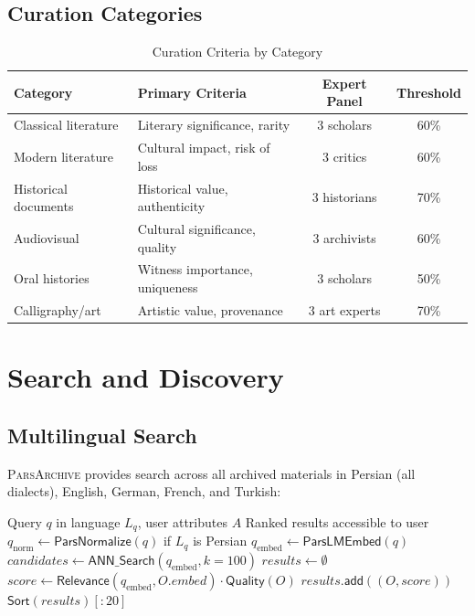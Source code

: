 \documentclass[11pt,a4paper]{article}
\newcommand{\parsarch}{\textsc{ParsArchive}\xspace}
\begin{document}
\subsection{Curation Categories}

\begin{table}[H]
\centering
\caption{Curation Criteria by Category}
\label{tab:curation}
\begin{tabular}{llcc}
\toprule
\textbf{Category} & \textbf{Primary Criteria} & \textbf{Expert Panel} & \textbf{Threshold} \\
\midrule
Classical literature & Literary significance, rarity & 3 scholars & 60\% \\
Modern literature & Cultural impact, risk of loss & 3 critics & 60\% \\
Historical documents & Historical value, authenticity & 3 historians & 70\% \\
Audiovisual & Cultural significance, quality & 3 archivists & 60\% \\
Oral histories & Witness importance, uniqueness & 3 scholars & 50\% \\
Calligraphy/art & Artistic value, provenance & 3 art experts & 70\% \\
\bottomrule
\end{tabular}
\end{table}

\section{Search and Discovery}

\subsection{Multilingual Search}

\parsarch provides search across all archived materials in Persian (all dialects), English, German, French, and Turkish:

\begin{algorithm}[H]
\caption{Cross-Lingual Search}
\label{alg:search}
\begin{algorithmic}[1]
\Require Query $q$ in language $L_q$, user attributes $A$
\Ensure Ranked results accessible to user
\State $q_{\text{norm}} \leftarrow \mathsf{ParsNormalize}(q)$ if $L_q$ is Persian
\State $q_{\text{embed}} \leftarrow \mathsf{ParsLMEmbed}(q)$ 
\State $\mathit{candidates} \leftarrow \mathsf{ANN\_Search}(q_{\text{embed}}, k=100)$
\State $\mathit{results} \leftarrow \emptyset$
        \State $\mathit{score} \leftarrow \mathsf{Relevance}(q_{\text{embed}}, O.\mathit{embed}) \cdot \mathsf{Quality}(O)$
        \State $\mathit{results}.\mathsf{add}((O, \mathit{score}))$
    \EndIf
\EndFor
\State \Return $\mathsf{Sort}(\mathit{results})[:20]$
\end{algorithmic}
\end{algorithm}
\end{document}
